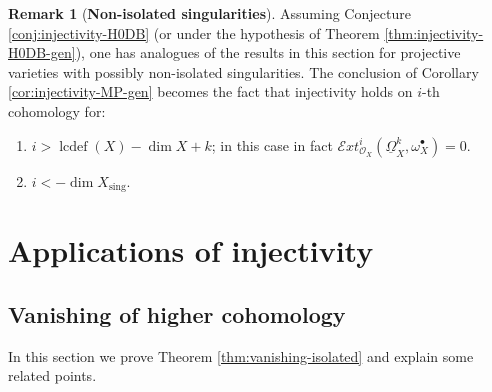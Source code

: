 \documentclass[11pt]{amsart}
\theoremstyle{definition}
\newtheorem{remark}[equation]{Remark}
\theoremstyle{plain}
\newcommand{\E}{\mathcal E}
\renewcommand{\H}{\mathcal H}
\renewcommand{\O}{\mathcal O}
\newcommand{\DD}{\mathbf D}
\newcommand{\xto}{\xrightarrow} %
\newcommand{\sExt}{\E xt} %
\newcommand{\DB}{\underline{\Omega}} %
\DeclareMathOperator{\sing}{sing}
\DeclareMathOperator{\lcdef}{lcdef}
\begin{document}
\begin{remark}[{\bf Non-isolated singularities}]
Assuming Conjecture \ref{conj:injectivity-H0DB} (or under the hypothesis of Theorem \ref{thm:injectivity-H0DB-gen}), one has analogues of the results in this section  for projective varieties with possibly non-isolated singularities. The conclusion of Corollary \ref{cor:injectivity-MP-gen} becomes the fact that injectivity holds on $i$-th cohomology for:
\begin{enumerate}
\item $i > \lcdef (X) - \dim X + k$; in this case in fact $\sExt_{\O_X}^i(\DB_X^k,\omega_X^{\bullet})=0$.
\item $i < - \dim X_{\sing}$.
\end{enumerate}
\end{remark}




\section{Applications of injectivity}


\subsection{Vanishing of higher cohomology}\label{scn:vanishing}
In this section we prove Theorem \ref{thm:vanishing-isolated} and explain some related points.

\end{document}
